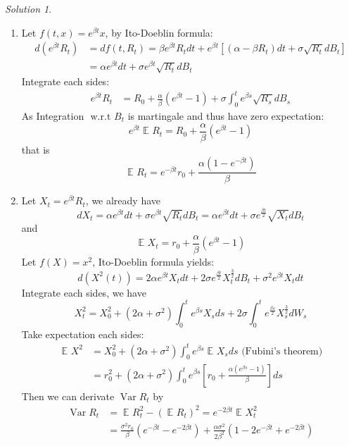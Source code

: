 \documentclass[
]{article}
\theoremstyle{definition}
\theoremstyle{definition}
\theoremstyle{definition}
\theoremstyle{definition}
\theoremstyle{remark}
\newtheorem*{solution}{Solution}
\begin{document}
\begin{solution}

\begin{enumerate}
\def\labelenumi{\alph{enumi}.}
\item
  Let \(f(t,x)=e^{\beta t}x\), by Ito-Doeblin formula:
  \[
  \begin{aligned}
   d (e^{\beta t}R_{t}) &= df(t,R_{t}) = \beta e^{\beta t} R_{t}dt+e^{\beta t} 
   \left[ \left( \alpha - \beta R_{t} \right)dt+\sigma \sqrt{R_{t}}dB_{t} \right]
   \\ &= 
   \alpha e^{\beta t}dt+\sigma e^{\beta t}\sqrt{R_{t}}dB_{t}
  \end{aligned}
  \]
  Integrate each sides:
  \[
  \begin{aligned}
   e^{\beta t}R_{t} &= R_0+ \frac{\alpha}{\beta} (e^{\beta t}-1)+\sigma \int_{0}^{t}  e^{\beta s}\sqrt{R_{s}} dB_{s} 
  \end{aligned}
  \]
  As Integration \(\text{ w.r.t } B_{t}\) is martingale and thus have zero expectation:
  \[
  e^{\beta t} \mathop{{}\mathbb{E}}_{}R_{t}=R_0+\frac{\alpha}{\beta} (e^{\beta t}-1)
  \]
  that is
  \[
  \mathop{{}\mathbb{E}}_{}R_{t}=e^{-\beta t} r_0+ \frac{\alpha(1-e^{-\beta t})}{\beta}
  \]
\item
  Let \(X_{t}=e^{\beta t}R_{t}\), we already have
  \[
  dX_{t}=
  \alpha e^{\beta t}dt+\sigma e^{\beta t}\sqrt{R_{t}}dB_{t}
  =
  \alpha e^{\beta t}dt+\sigma e^{\frac{\beta t}{2}}\sqrt{X_{t}}dB_{t}
  \]
  and
  \[
  \mathop{{}\mathbb{E}}_{}X_{t}=r_0+\frac{\alpha}{\beta} (e^{\beta t}-1)
  \]
  Let \(f(X)=x^2\), Ito-Doeblin formula yields:
  \[
  d(X^2(t))=2\alpha e^{\beta t} X_{t} dt+2\sigma e^{\frac{\beta t}{2}}X^{\frac{3}{2}}_{t}dB_{t}+\sigma^2e^{\beta t}X_{t}dt
  \]
  Integrate each sides, we have
  \[
  X^2_{t}=X^2_{0}+(2\alpha+\sigma^2)\int_{0}^{t} e^{\beta s}X_{s}ds+2\sigma \int_{0}^{t} e^{\frac{\beta s}{2}}X^{\frac{3}{2}}_{s}dW_{s}
  \]
  Take expectation each sides:
  \[
  \begin{aligned}
   \mathop{{}\mathbb{E}}_{}X^2 &= X^2_{0}+(2\alpha +\sigma^2)\int_{0}^{t} e^{\beta s}\mathop{{}\mathbb{E}}_{}X_{s}ds \text{ (Fubini's theorem)}
   \\ &= 
   r_0^2+(2\alpha+\sigma^2 ) \int_{0}^{t} e^{\beta s} \left[ r_0+\frac{\alpha(e^{\beta s}-1)}{\beta} \right]ds 
   
  \end{aligned}
  \]
  Then we can derivate \(\mathop{\text{Var}}R_{t}\) by
  \[
  \begin{aligned}
   \mathop{\text{Var}}R_{t}&=\mathop{{}\mathbb{E}}_{}R^2_{t}-(\mathop{{}\mathbb{E}}_{}R_{t})^2=e^{-2\beta t} \mathop{{}\mathbb{E}}_{}X^2_{t}
   
   
   \\ &= 
   \frac{\sigma^2r_0}{\beta}(e^{-\beta t}-e^{-2\beta t})+\frac{\alpha \sigma^2}{2\beta^2} (1-2e^{-\beta t}+e^{-2\beta t})
  \end{aligned}
  \]
\end{enumerate}

\end{solution}
\end{document}

